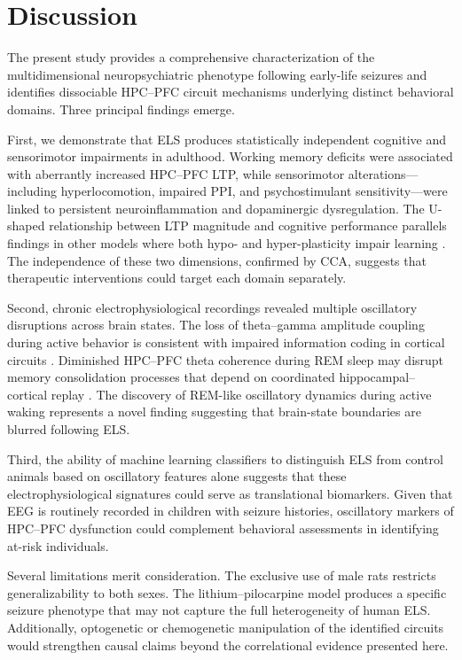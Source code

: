 \documentclass[11pt]{article}
\begin{document}
\section{Discussion}

The present study provides a comprehensive characterization of the multidimensional neuropsychiatric phenotype following early-life seizures and identifies dissociable HPC--PFC circuit mechanisms underlying distinct behavioral domains. Three principal findings emerge.

First, we demonstrate that ELS produces statistically independent cognitive and sensorimotor impairments in adulthood. Working memory deficits were associated with aberrantly increased HPC--PFC LTP, while sensorimotor alterations---including hyperlocomotion, impaired PPI, and psychostimulant sensitivity---were linked to persistent neuroinflammation and dopaminergic dysregulation. The U-shaped relationship between LTP magnitude and cognitive performance parallels findings in other models where both hypo- and hyper-plasticity impair learning \citep{laroche2000hippocampal, jay1995nmda}. The independence of these two dimensions, confirmed by CCA, suggests that therapeutic interventions could target each domain separately.

Second, chronic electrophysiological recordings revealed multiple oscillatory disruptions across brain states. The loss of theta--gamma amplitude coupling during active behavior is consistent with impaired information coding in cortical circuits \citep{colgin2009frequency, canolty2010high}. Diminished HPC--PFC theta coherence during REM sleep may disrupt memory consolidation processes that depend on coordinated hippocampal--cortical replay \citep{boyce2016causal, benchenane2010coherence}. The discovery of REM-like oscillatory dynamics during active waking represents a novel finding suggesting that brain-state boundaries are blurred following ELS.

Third, the ability of machine learning classifiers to distinguish ELS from control animals based on oscillatory features alone suggests that these electrophysiological signatures could serve as translational biomarkers. Given that EEG is routinely recorded in children with seizure histories, oscillatory markers of HPC--PFC dysfunction could complement behavioral assessments in identifying at-risk individuals.

Several limitations merit consideration. The exclusive use of male rats restricts generalizability to both sexes. The lithium--pilocarpine model produces a specific seizure phenotype that may not capture the full heterogeneity of human ELS. Additionally, optogenetic or chemogenetic manipulation of the identified circuits would strengthen causal claims beyond the correlational evidence presented here.
\end{document}

